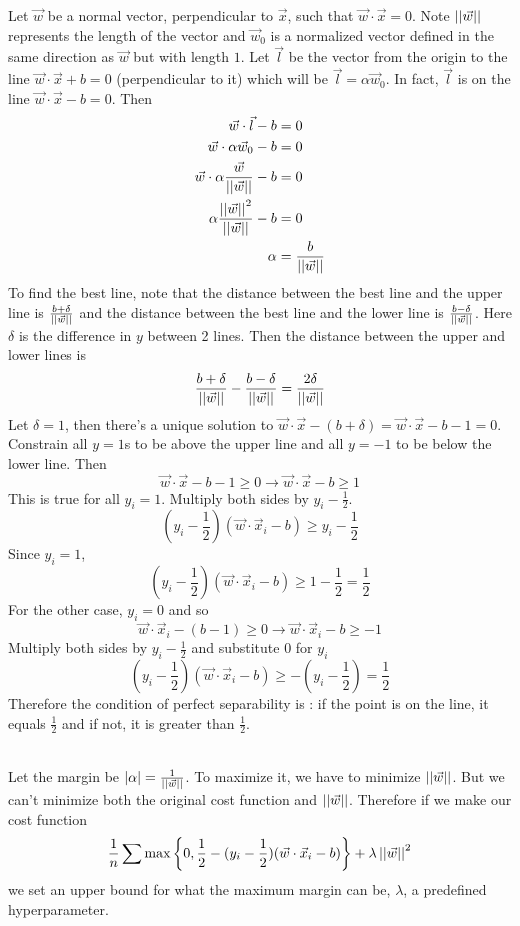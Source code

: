 \documentclass[12pt]{article}
\begin{document}
\begin{enumerate}
Let $\vec{w}$ be a normal vector, perpendicular to $\vec{x}$, such that $\vec{w} \cdot \vec{x} = 0$. Note $\left|\left|\vec{w}\right|\right|$ represents the length of the vector and $\vec{w}_0$ is a normalized vector defined in the same direction as $\vec{w}$ but with length $1$. Let $\vec{l}$ be the vector from the origin to the line $\vec{w} \cdot \vec{x} + b = 0$ (perpendicular to it) which will be $\vec{l} = \alpha \vec{w}_0$. In fact, $\vec{l}$ is on the line $\vec{w} \cdot \vec{x}  - b = 0$. Then $$ \begin{aligned} 
\vec{w} \cdot \vec{l} - b &= 0 \\ \vec{w} \cdot \alpha\vec{w}_0 - b &= 0 \\ \vec{w} \cdot \alpha \frac{\vec{w}}{\left|\left|\vec{w}\right|\right|}  - b &= 0 \\ \alpha\frac{\left|\left|\vec{w}\right|\right|^2}{\left|\left|\vec{w}\right|\right|} - b &= 0 \\ \alpha &= \frac{b}{\left|\left|\vec{w}\right|\right|} \end{aligned} $$ 
To find the best line, note that the distance between the best line and the upper line is $\frac{b + \delta}{\left|\left|\vec{w}\right|\right|}$ and the distance between the best line and the lower line is $\frac{b - \delta}{\left|\left|\vec{w}\right|\right|}$. Here $\delta$ is the difference in $y$ between 2 lines. Then the distance between the upper and lower lines is $$ \frac{b+ \delta}{\left|\left|\vec{w}\right|\right|} - \frac{b-\delta}{\left|\left|\vec{w}\right|\right|} = \frac{2\delta}{\left|\left|\vec{w}\right|\right|}$$ Let $\delta = 1$, then there's a unique solution to $\vec{w} \cdot \vec{x} - (b + \delta) = \vec{w} \cdot \vec{x} - b -1 = 0$. Constrain all $y=1$s to be above the upper line and all $y=-1$ to be below the lower line. Then $$\vec{w} \cdot \vec{x} - b - 1 \geq 0 \to \vec{w} \cdot \vec{x} - b \geq 1 $$ 
This is true for all $y_i = 1$. Multiply both sides by $y_i - \frac{1}{2}$.
$$ (y_i - \frac{1}{2})(\vec{w} \cdot \vec{x}_i - b) \geq y_i - \frac{1}{2} $$ Since $y_i = 1$, 
$$(y_i - \frac{1}{2})(\vec{w} \cdot \vec{x}_i - b) \geq 1 - \frac{1}{2} = \frac{1}{2}$$ 
For the other case, $y_i = 0$ and so $$ \vec{w} \cdot \vec{x}_i - (b-1) \geq 0 \to \vec{w} \cdot \vec{x}_i - b \geq -1 $$ 
Multiply both sides by $y_i - \frac{1}{2}$ and substitute $0$ for $y_i$
$$ (y_i - \frac{1}{2})(\vec{w} \cdot \vec{x}_i - b) \geq -(y_i - \frac{1}{2}) = \frac{1}{2}$$ 
Therefore the condition of perfect separability is : if the point is on the line, it equals $\frac{1}{2}$ and if not, it is greater than $\frac{1}{2}$. 

 \\
Let the margin be $|\alpha| = \frac{1}{\left|\left|\vec{w}\right|\right|}$. To maximize it, we have to minimize $\left|\left|\vec{w}\right|\right|$. But we can't minimize both the original cost function and $\left|\left|\vec{w}\right|\right|$. Therefore if we make our cost function
$$ \frac{1}{n} \sum \text{max}\left\{0, \frac{1}{2} - (y_i - \frac{1}{2})(\vec{w} \cdot \vec{x}_i - b)\right\} + \lambda \left|\left|\vec{w}\right|\right|^2 $$ 
we set an upper bound for what the maximum margin can be, $\lambda$, a predefined hyperparameter. 

\end{enumerate}
\end{document}
